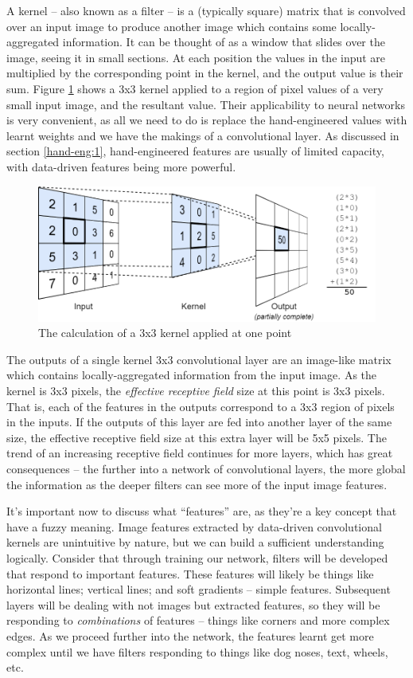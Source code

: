 \documentclass{report}
\begin{document}
A kernel -- also known as a filter -- is a (typically square) matrix that is convolved over an input image to produce another image which contains some locally-aggregated information. It can be thought of as a window that slides over the image, seeing it in small sections. At each position the values in the input are multiplied by the corresponding point in the kernel, and the output value is their sum. Figure \ref{fig:kernel:1} shows a 3x3 kernel applied to a region of pixel values of a very small input image, and the resultant value. Their applicability to neural networks is very convenient, as all we need to do is replace the hand-engineered values with learnt weights and we have the makings of a convolutional layer. As discussed in section \ref{hand-eng:1}, hand-engineered features are usually of limited capacity, with data-driven features being more powerful. \par
\begin{figure}[!h]
 \centering
 \includegraphics[width=12cm]{kernelimg}
 \caption{The calculation of a 3x3 kernel applied at one point}
 \label{fig:kernel:1}
\end{figure}
The outputs of a single kernel 3x3 convolutional layer are an image-like matrix which contains locally-aggregated information from the input image. As the kernel is 3x3 pixels, the \textit{effective receptive field} size at this point is 3x3 pixels. That is, each of the features in the outputs correspond to a 3x3 region of pixels in the inputs. If the outputs of this layer are fed into another layer of the same size, the effective receptive field size at this extra layer will be 5x5 pixels. The trend of an increasing receptive field continues for more layers, which has great consequences -- the further into a network of convolutional layers, the more global the information as the deeper filters can see more of the input image features. \par
It's important now to discuss what ``features'' are, as they're a key concept that have a fuzzy meaning. Image features extracted by data-driven convolutional kernels are unintuitive by nature, but we can build a sufficient understanding logically. Consider that through training our network, filters will be developed that respond to important features. These features will likely be things like horizontal lines; vertical lines; and soft gradients -- simple features. Subsequent layers will be dealing with not images but extracted features, so they will be responding to \textit{combinations} of features -- things like corners and more complex edges. As we proceed further into the network, the features learnt get more complex until we have filters responding to things like dog noses, text, wheels, etc. \par
\end{document}
